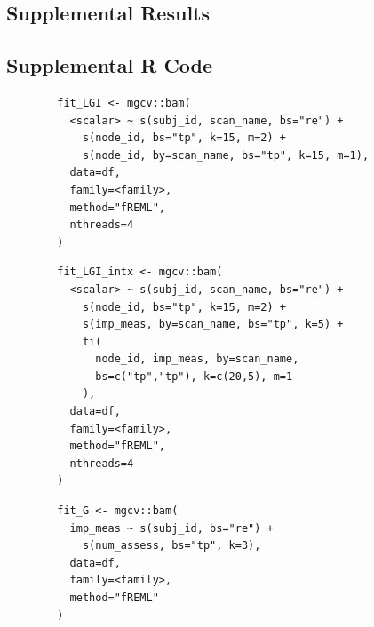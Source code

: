 \documentclass[12pt]{article}
\begin{document}
\subsection{Supplemental Results}
\label{ssec:supp-res}


\subsection{Supplemental R Code}
\label{ssec:supp-rcode}

\begin{equ}[H]
	\begin{lstlisting}
		fit_LGI <- mgcv::bam(
		  <scalar> ~ s(subj_id, scan_name, bs="re") +
		    s(node_id, bs="tp", k=15, m=2) +
		    s(node_id, by=scan_name, bs="tp", k=15, m=1),
		  data=df,
		  family=<family>,
		  method="fREML",
		  nthreads=4
		)
	\end{lstlisting}
	\caption{Tract scalars are modeled as a function of tract node with thin-plate regression splines using both global and group (\lstinline{scan_name}) smooths as well as individual group wiggliness. \lstinline{<scalar>} = relevant DWI metric (AD, RD, MD, or FA), \lstinline{scan_name} = visit identifier factor (Base, Post, RTP), \lstinline{<family>} = relevant family and link function for scalar distribution.}
	\label{supp-code:gam-lgi}
\end{equ}


\begin{equ}[H]
	\begin{lstlisting}
		fit_LGI_intx <- mgcv::bam(
		  <scalar> ~ s(subj_id, scan_name, bs="re") +
		    s(node_id, bs="tp", k=15, m=2) +
		    s(imp_meas, by=scan_name, bs="tp", k=5) +
		    ti(
		      node_id, imp_meas, by=scan_name,
		      bs=c("tp","tp"), k=c(20,5), m=1
		    ),
		  data=df,
		  family=<family>,
		  method="fREML",
		  nthreads=4
		)
	\end{lstlisting}
	\caption{Tract scalars are modeled as a function of separate 1D node and ImPACT smooths as well as a 2D tensor product interaction surface. \lstinline{imp_meas} = ImPACT composite or total symptom measure.}
	\label{supp-code:gam-lgi-intx}
\end{equ}


\begin{equ}[H]
	\begin{lstlisting}
		fit_G <- mgcv::bam(
		  imp_meas ~ s(subj_id, bs="re") +
		    s(num_assess, bs="tp", k=3),
		  data=df,
		  family=<family>,
		  method="fREML"
		)
	\end{lstlisting}
	\caption{ImPACT metrics modeled as a function of number of assessments using a single global smooth. \lstinline{imp_meas} = ImPACT composite or total symptom score, \lstinline{num_assess} = assessment number (1=Base, 2=Post, 3=RTP).}
	\label{supp-code:gam-impact}
\end{equ}
\end{document}
